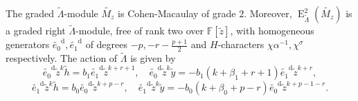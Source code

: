 \documentclass[11pt,a4paper]{article} %
\def\FF{\mathbb{F}}
\def\d{\operatorname{d}}
\def\E{\operatorname{E}}
\begin{document}
\begin{lemma}\label{lem:grM_z-dual}
    The graded $\widetilde{\Lambda}$-module $\widetilde{M_z}$ is Cohen-Macaulay of grade $2$. Moreover, $\E^2_{\widetilde{\Lambda}}(\widetilde{M_z})$
    is a graded right $\widetilde{\Lambda}$-module, free of rank two over $\FF[\widetilde z]$, with homogeneous generators $\widetilde{e_0}^{\d},\widetilde{e_1}^{\d}$ of degrees
    $-p,-r-\frac{p+1}{2}$ and $H$-characters $\chi\alpha^{-1},\chi^\sigma$ respectively. The action of $\widetilde{\Lambda}$ is given by
    \[
    \widetilde{e_0}^{\d}\widetilde{z}^k\widetilde{h}=b_1\widetilde{e_1}^{\d}\widetilde{z}^{k+r+1},\quad \widetilde{e_0}^{\d}\widetilde{z}^k\widetilde{y}=-b_1(k+\beta_1+r+1)\widetilde{e_1}^{\d}\widetilde{z}^{k+r},
    \]
    \[
    \widetilde{e_1}^{\d}\widetilde{z}^k\widetilde{h}=b_0\widetilde{e_0}^{\d}\widetilde{z}^{k+p-r},\quad \widetilde{e_1}^{\d}\widetilde{z}^k\widetilde{y}=-b_0(k+\beta_0+p-r)\widetilde{e_0}^{\d}\widetilde{z}^{k+p-1-r}.
    \]
\end{lemma}
\end{document}
